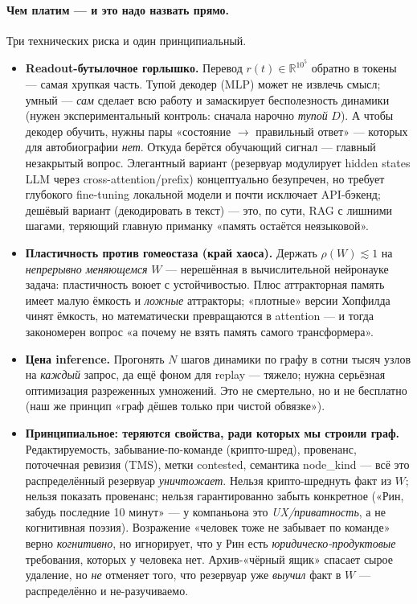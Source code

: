 \paragraph{Чем платим — и это надо назвать прямо.} Три технических риска и один
принципиальный.
\begin{itemize}\itemsep3pt
\item \textbf{Readout-бутылочное горлышко.} Перевод $r(t)\in\mathbb{R}^{10^5}$ обратно в
токены — самая хрупкая часть. Тупой декодер (MLP) может не извлечь смысл; умный — \emph{сам}
сделает всю работу и замаскирует бесполезность динамики (нужен экспериментальный контроль:
сначала нарочно \emph{тупой} $D$). А чтобы декодер обучить, нужны пары «состояние $\to$
правильный ответ» — которых для автобиографии \emph{нет}. Откуда берётся обучающий сигнал —
главный незакрытый вопрос. Элегантный вариант (резервуар модулирует hidden states LLM через
cross-attention/prefix) концептуально безупречен, но требует глубокого fine-tuning локальной
модели и почти исключает API-бэкенд; дешёвый вариант (декодировать в текст) — это, по сути,
RAG с лишними шагами, теряющий главную приманку «память остаётся неязыковой».
\item \textbf{Пластичность против гомеостаза (край хаоса).} Держать $\rho(W)\lesssim1$ на
\emph{непрерывно меняющемся} $W$ — нерешённая в вычислительной нейронауке задача: пластичность
воюет с устойчивостью. Плюс аттракторная память имеет малую ёмкость и \emph{ложные}
аттракторы; «плотные» версии Хопфилда чинят ёмкость, но математически превращаются в
attention — и тогда закономерен вопрос «а почему не взять память самого трансформера».
\item \textbf{Цена inference.} Прогонять $N$ шагов динамики по графу в сотни тысяч узлов на
\emph{каждый} запрос, да ещё фоном для replay — тяжело; нужна серьёзная оптимизация разреженных
умножений. Это не смертельно, но и не бесплатно (наш же принцип «граф дёшев только при чистой
обвязке»).
\item \textbf{Принципиальное: теряются свойства, ради которых мы строили граф.}
Редактируемость, забывание-по-команде (крипто-шред), провенанс, поточечная ревизия (TMS),
метки contested, семантика node\_kind — всё это распределённый резервуар \emph{уничтожает}.
Нельзя крипто-шреднуть факт из $W$; нельзя показать провенанс; нельзя гарантированно забыть
конкретное («Рин, забудь последние 10 минут» — у компаньона это \emph{UX/приватность}, а не
когнитивная поэзия). Возражение «человек тоже не забывает по команде» верно \emph{когнитивно},
но игнорирует, что у Рин есть \emph{юридическо-продуктовые} требования, которых у человека нет.
Архив-«чёрный ящик» спасает сырое удаление, но \emph{не} отменяет того, что резервуар уже
\emph{выучил} факт в $W$ — распределённо и не-разучиваемо.
\end{itemize}

